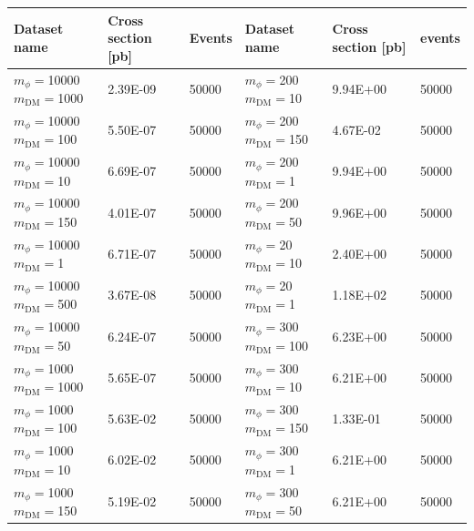 \begin{table}[]
\centering
\small
\begin{tabular}{lll||lll}
\hline
Dataset name        & Cross section [pb]  & Events    & Dataset name  & Cross section [pb]  & events           \\\hline
$m_\phi=$10000 $m_\textrm{DM}=$1000       & 2.39E-09     & 50000                  & $m_\phi=$200 $m_\textrm{DM}=$10           & 9.94E+00     & 50000                  \\ 
$m_\phi=$10000 $m_\textrm{DM}=$100        & 5.50E-07     & 50000                  & $m_\phi=$200 $m_\textrm{DM}=$150          & 4.67E-02     & 50000                  \\ 
$m_\phi=$10000 $m_\textrm{DM}=$10         & 6.69E-07     & 50000                  & $m_\phi=$200 $m_\textrm{DM}=$1            & 9.94E+00     & 50000                  \\ 
$m_\phi=$10000 $m_\textrm{DM}=$150        & 4.01E-07     & 50000                  & $m_\phi=$200 $m_\textrm{DM}=$50           & 9.96E+00     & 50000                  \\ 
$m_\phi=$10000 $m_\textrm{DM}=$1          & 6.71E-07     & 50000                  & $m_\phi=$20 $m_\textrm{DM}=$10            & 2.40E+00     & 50000                  \\ 
$m_\phi=$10000 $m_\textrm{DM}=$500        & 3.67E-08     & 50000                  & $m_\phi=$20 $m_\textrm{DM}=$1             & 1.18E+02     & 50000                  \\ 
$m_\phi=$10000 $m_\textrm{DM}=$50         & 6.24E-07     & 50000                  & $m_\phi=$300 $m_\textrm{DM}=$100          & 6.23E+00     & 50000                  \\ 
$m_\phi=$1000 $m_\textrm{DM}=$1000        & 5.65E-07     & 50000                  & $m_\phi=$300 $m_\textrm{DM}=$10           & 6.21E+00     & 50000                  \\ 
$m_\phi=$1000 $m_\textrm{DM}=$100         & 5.63E-02     & 50000                  & $m_\phi=$300 $m_\textrm{DM}=$150          & 1.33E-01     & 50000                  \\ 
$m_\phi=$1000 $m_\textrm{DM}=$10          & 6.02E-02     & 50000                  & $m_\phi=$300 $m_\textrm{DM}=$1            & 6.21E+00     & 50000                  \\ 
$m_\phi=$1000 $m_\textrm{DM}=$150         & 5.19E-02     & 50000                  & $m_\phi=$300 $m_\textrm{DM}=$50           & 6.21E+00     & 50000                  \\ 

\end{tabular}
\end{table}
